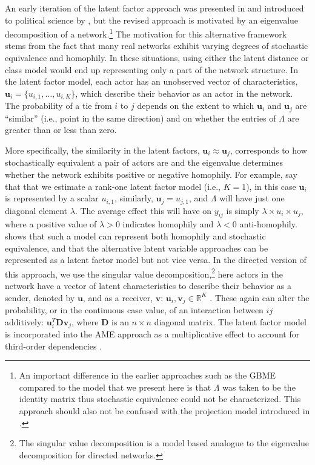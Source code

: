 \documentclass[12pt,pdflatex]{elsarticle}
\begin{document}
An early iteration of the latent factor approach was presented in \citet{hoff:2005} and introduced to political science by \citet{hoff:ward:2004}, but the revised approach is motivated by an eigenvalue decomposition of a network.\footnote{An important difference in the earlier approaches such as the GBME compared to the model that we present here is that $\Lambda$ was taken to be the identity matrix thus stochastic equivalence could not be characterized. This approach should also not be confused with the projection model introduced in \citet{hoff:etal:2002}.} The motivation for this alternative framework stems from the fact that many real networks exhibit varying degrees of stochastic equivalence and homophily. In these situations, using either the latent distance or class model would end up representing only a part of the network structure. In the latent factor model, each actor has an unobserved vector of characteristics, $\textbf{u}_{i} = \{u_{i,1}, \ldots, u_{i,K} \}$, which describe their behavior as an actor in the network. The probability of a tie from $i$ to $j$ depends on the extent to which $\textbf{u}_{i}$ and $\textbf{u}_{j}$ are ``similar'' (i.e., point in the same direction) and on whether the entries of $\Lambda$ are greater than or less than zero. 

More specifically, the similarity in the latent factors, $\textbf{u}_{i} \approx \textbf{u}_{j}$, corresponds to how stochastically equivalent a pair of actors are and the eigenvalue determines whether the network exhibits positive or negative homophily. For example, say that that we estimate a rank-one latent factor model (i.e., $K=1$), in this case $\textbf{u}_{i}$ is represented by a scalar $u_{i,1}$, similarly, $\textbf{u}_{j}=u_{j,1}$, and $\Lambda$ will have just one diagonal element $\lambda$. The average effect this will have on $y_{ij}$ is simply $\lambda \times u_{i} \times u_{j}$, where a positive value of $\lambda>0$ indicates homophily and $\lambda<0$ anti-homophily. \citet{hoff:2008} shows that such a model can represent both homophily and stochastic equivalence, and that the alternative latent variable approaches can be represented as a latent factor model but not vice versa. In the directed version of this approach, we use the singular value decomposition,\footnote{The singular value decomposition is a model based analogue to the eigenvalue decomposition for directed networks.} here actors in the network have a vector of latent characteristics to describe their behavior as a sender, denoted by $\textbf{u}$, and as a receiver, $\textbf{v}$: $\textbf{u}_{i}, \textbf{v}_{j} \in \mathbb{R}^{K}$ \citep{hoff:2009}. These again can alter the probability, or in the continuous case value, of an interaction between $ij$ additively: $\textbf{u}_{i}^{T} \textbf{D} \textbf{v}_{j}$, where $\textbf{D}$ is an $n \times n$ diagonal matrix. 
The latent factor model is incorporated into the AME approach as a multiplicative effect to account for third-order dependencies \citep{hoff:2009,hoff:etal:2015}.  
\end{document}
